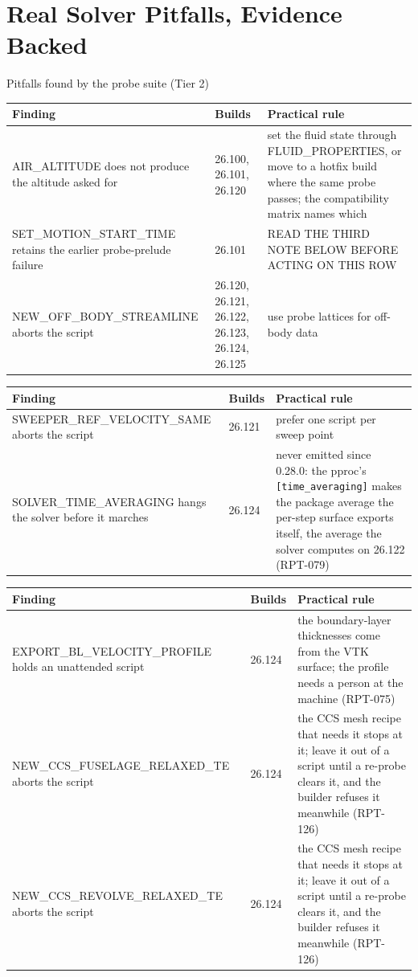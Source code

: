 \documentclass[aspectratio=169,10pt]{beamer}
\newcommand{\code}[1]{\texttt{\small #1}}
\begin{document}
\section{Real Solver Pitfalls, Evidence Backed}

\begin{frame}[allowframebreaks]{Pitfalls found by the probe suite (Tier 2)}
  \footnotesize
  \begin{tabular}{@{}p{6.0cm}p{1.6cm}p{6.5cm}@{}}
    \toprule
    Finding & Builds & Practical rule \\
    \midrule
    AIR\_ALTITUDE does not produce the altitude asked for & 26.100, 26.101, 26.120 & set the fluid state through FLUID\_PROPERTIES, or move to a hotfix build where the same probe passes; the compatibility matrix names which \\
    SET\_MOTION\_START\_TIME retains the earlier probe-prelude failure & 26.101 & READ THE THIRD NOTE BELOW BEFORE ACTING ON THIS ROW \\
    NEW\_OFF\_BODY\_STREAMLINE aborts the script & 26.120, 26.121, 26.122, 26.123, 26.124, 26.125 & use probe lattices for off-body data \\
    \bottomrule
  \end{tabular}

  \begin{tabular}{@{}p{6.0cm}p{1.6cm}p{6.5cm}@{}}
    \toprule
    Finding & Builds & Practical rule \\
    \midrule
    SWEEPER\_REF\_VELOCITY\_SAME aborts the script & 26.121 & prefer one script per sweep point \\
    SOLVER\_TIME\_AVERAGING hangs the solver before it marches & 26.124 & never emitted since 0.28.0: the pproc's \code{[time\_averaging]} makes the package average the per-step surface exports itself, the average the solver computes on 26.122 (RPT-079) \\
    \bottomrule
  \end{tabular}

  \begin{tabular}{@{}p{6.0cm}p{1.6cm}p{6.5cm}@{}}
    \toprule
    Finding & Builds & Practical rule \\
    \midrule
    EXPORT\_BL\_VELOCITY\_PROFILE holds an unattended script & 26.124 & the boundary-layer thicknesses come from the VTK surface; the profile needs a person at the machine (RPT-075) \\
    NEW\_CCS\_FUSELAGE\_RELAXED\_TE aborts the script & 26.124 & the CCS mesh recipe that needs it stops at it; leave it out of a script until a re-probe clears it, and the builder refuses it meanwhile (RPT-126) \\
    NEW\_CCS\_REVOLVE\_RELAXED\_TE aborts the script & 26.124 & the CCS mesh recipe that needs it stops at it; leave it out of a script until a re-probe clears it, and the builder refuses it meanwhile (RPT-126) \\
    \bottomrule
  \end{tabular}


\end{frame}
\end{document}
